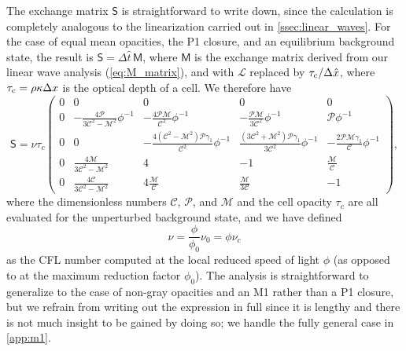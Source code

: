 \documentclass[preprint,12pt,authoryear]{elsarticle}
\newcommand{\tenS}{\mathsf{S}}
\newcommand{\tenM}{\mathsf{M}}
\newcommand{\hatt}{\hat{t}}
\newcommand{\hx}{\hat{x}}
\newcommand{\calC}{\mathcal{C}}
\newcommand{\calP}{\mathcal{P}}
\newcommand{\calM}{\mathcal{M}}
\newcommand{\calL}{\mathcal{L}}
\begin{document}
The exchange matrix $\tenS$ is straightforward to write down, since the calculation is completely analogous to the linearization carried out in \autoref{ssec:linear_waves}. For the case of equal mean opacities, the P1 closure, and an equilibrium background state, the result is $\tenS = \Delta\hatt \, \tenM$, where $\tenM$ is the exchange matrix derived from our linear wave analysis (\autoref{eq:M_matrix}), and with $\calL$ replaced by $\tau_{\rm c}/\Delta\hx$, where $\tau_{\rm c} = \rho\kappa\Delta x$ is the optical depth of a cell. We therefore have
\begin{equation}
    \tenS =
    \nu \tau_c
    \left(\begin{array}{ccccc}
    0 & 0 & 0 & 0 & 0 \\
    0 & -\frac{4\calP}{3\calC^2-\calM^2}\phi^{-1} & -\frac{4\calP\calM}{\calC^2}\phi^{-1} & -\frac{\calP\calM}{3\calC^2}\phi^{-1} & \calP\phi^{-1} \\
    0 & 0 & -\frac{4\left(\calC^2-\calM^2\right)\calP\gamma_1}{\calC^2}\phi^{-1} & \frac{\left(3\calC^2+\calM^2\right)\calP\gamma_1}{3\calC^2}\phi^{-1} & -\frac{2\calP\calM\gamma_1}{\calC}\phi^{-1} \\
    0 & \frac{4\calM}{3\calC^2-\calM^2} & 4 & -1 & \frac{\calM}{\calC} \\
    0 & \frac{4\calC}{3\calC^2-\calM^2} & 4\frac{\calM}{\calC} & \frac{\calM}{3\calC} & -1
    \end{array}\right),
    \label{eq:S_matrix}
\end{equation}
where the dimensionless numbers $\calC$, $\calP$, and $\calM$ and the cell opacity $\tau_c$ are all evaluated for the unperturbed background state, and we have defined
\begin{equation}
    \nu = \frac{\phi}{\phi_0} \nu_0 = \phi \nu_c
\end{equation}
as the CFL number computed at the local reduced speed of light $\phi$ (as opposed to at the maximum reduction factor $\phi_0$). The analysis is straightforward to generalize to the case of non-gray opacities and an M1 rather than a P1 closure, but we refrain from writing out the expression in full since it is lengthy and there is not much insight to be gained by doing so; we handle the fully general case in \ref{app:m1}.
\end{document}
